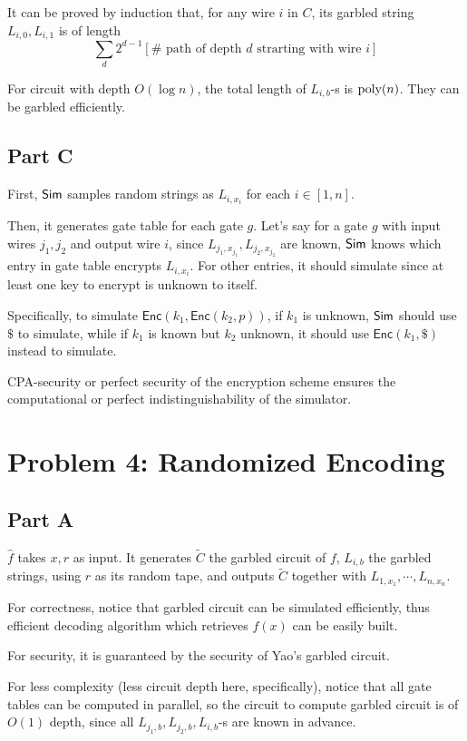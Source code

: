 \documentclass[8pt]{article}
\theoremstyle{compact}
\def\Enc{\textsf{Enc}}
\begin{document}
It can be proved by induction that, for any wire $i$ in $C$, its garbled string $L_{i, 0}, L_{i, 1}$ is of length $$\sum_d 2^{d-1} [\# \text{ path of depth }d\text{ strarting with wire }i]$$

For circuit with depth $O(\log n)$, the total length of $L_{i, b}$-s is $\text{poly}(n)$. They can be garbled efficiently.

\subsection*{Part C}

First, $\textsf{Sim}$ samples random strings as $L_{i, x_i}$ for each $i \in [1, n]$.

Then, it generates gate table for each gate $g$. Let's say for a gate $g$ with input wires $j_1, j_2$ and output wire $i$, since $L_{j_1, x_{j_1}}, L_{j_2, x_{j_2}}$ are known, $\textsf{Sim}$ knows which entry in gate table encrypts $L_{i, x_i}$. For other entries, it should simulate since at least one key to encrypt is unknown to itself.

Specifically, to simulate $\Enc(k_1, \Enc(k_2, p))$, if $k_1$ is unknown, $\textsf{Sim}$ should use $\$$ to simulate, while if $k_1$ is known but $k_2$ unknown, it should use $\Enc(k_1, \$)$ instead to simulate.

CPA-security or perfect security of the encryption scheme ensures the computational or perfect indistinguishability of the simulator.

\section*{Problem 4: Randomized Encoding}
\subsection*{Part A}

$\hat{f}$ takes $x, r$ as input. It generates $\tilde C$ the garbled circuit of $f$, $L_{i, b}$ the garbled strings, using $r$ as its random tape, and outputs $\tilde{C}$ together with $L_{1, x_1}, \cdots, L_{n, x_n}$.

For correctness, notice that garbled circuit can be simulated efficiently, thus efficient decoding algorithm which retrieves $f(x)$ can be easily built.

For security, it is guaranteed by the security of Yao's garbled circuit.

For less complexity (less circuit depth here, specifically), notice that all gate tables can be computed in parallel, so the circuit to compute garbled circuit is of $O(1)$ depth, since all $L_{j_1, b}, L_{j_2, b}, L_{i, b}$-s are known in advance.
\end{document}
